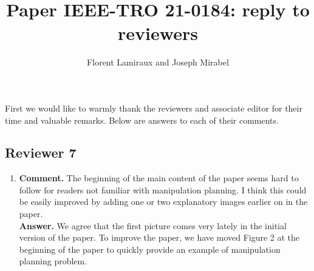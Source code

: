 \documentclass{article}
\title{Paper IEEE-TRO 21-0184: reply to reviewers}
\author{Florent Lamiraux and Joseph Mirabel}
\date{}
\begin{document}
\maketitle

First we would like to warmly thank the reviewers and associate editor for their
time and valuable remarks. Below are answers to each of their comments.
\subsection*{Reviewer 7}
\begin{enumerate}
  \item \textbf{Comment.} The beginning of the main content of the
    paper seems hard to follow for readers not familiar with
    manipulation planning.  I think this could be easily improved by
    adding one or two explanatory images earlier on in the
    paper.\\
    \textbf{Answer.} We agree that the first picture comes very lately in the
    initial version of the paper. To improve the paper, we have moved Figure 2
    at the beginning of the paper to quickly provide an example of manipulation
    planning problem.
\end{enumerate}
\end{document}
